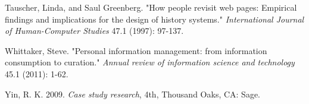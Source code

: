 \documentclass{casconpaper}
\begin{document}
{\begin{thebibliography}{9}
Tauscher, Linda, and Saul Greenberg. "How people revisit web pages: Empirical findings and implications for the design of history systems." \emph{International Journal of Human-Computer Studies} 47.1 (1997): 97-137.

Whittaker, Steve. "Personal information management: from information consumption to curation." \emph{Annual review of information science and technology} 45.1 (2011): 1-62.

 Yin, R. K. 2009. \emph{Case study research}, 4th, Thousand Oaks, CA: Sage.


    
\end{thebibliography}
} %
\end{document}
